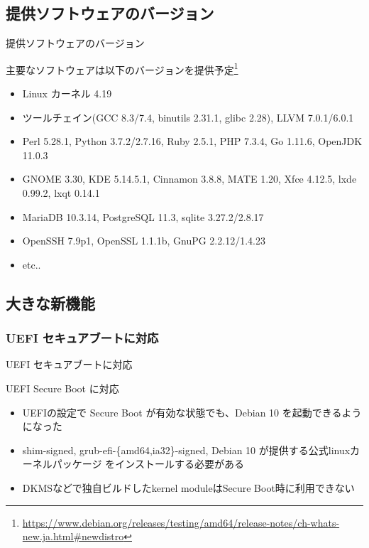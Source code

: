 \subsection{提供ソフトウェアのバージョン}

\begin{frame}{提供ソフトウェアのバージョン}%

主要なソフトウェアは以下のバージョンを提供予定\footnote{\url{https://www.debian.org/releases/testing/amd64/release-notes/ch-whats-new.ja.html\#newdistro}}

\begin{itemize}
\item Linux カーネル 4.19
\item ツールチェイン(GCC 8.3/7.4, binutils 2.31.1, glibc 2.28), LLVM 7.0.1/6.0.1
\item Perl 5.28.1, Python 3.7.2/2.7.16, Ruby 2.5.1, PHP 7.3.4, Go 1.11.6, OpenJDK 11.0.3
\item GNOME 3.30, KDE 5.14.5.1, Cinnamon 3.8.8, MATE 1.20, Xfce 4.12.5, lxde 0.99.2, lxqt 0.14.1
\item MariaDB 10.3.14, PostgreSQL 11.3, sqlite 3.27.2/2.8.17 
\item OpenSSH 7.9p1, OpenSSL 1.1.1b, GnuPG 2.2.12/1.4.23
\item etc..
\end{itemize}

\end{frame}


\subsection{大きな新機能}


\subsubsection{UEFI セキュアブートに対応}


\begin{frame}{UEFI セキュアブートに対応}%

UEFI Secure Boot に対応
 
\begin{itemize}
\item UEFIの設定で Secure Boot が有効な状態でも、Debian 10 を起動できるようになった
\item shim-signed, grub-efi-\{amd64,ia32\}-signed, Debian 10 が提供する公式linuxカーネルパッケージ をインストールする必要がある
\item DKMSなどで独自ビルドしたkernel moduleはSecure Boot時に利用できない
\end{itemize}
    
\end{frame}


